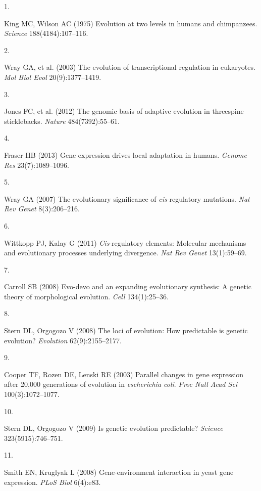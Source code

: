 \documentclass[9pt,twocolumn,twoside,lineno]{pnas-new}
\newlength{\cslhangindent}
\newlength{\csllabelwidth}
\newlength{\cslentryspacingunit} %
\newenvironment{CSLReferences}[2] %
 {%
  \setlength{\parindent}{0pt}
  \ifodd #1
  \let\oldpar\par
  \def\par{\hangindent=\cslhangindent\oldpar}
  \fi
  \setlength{\parskip}{#2\cslentryspacingunit}
 }%
 {}
\newcommand{\CSLLeftMargin}[1]{\parbox[t]{\csllabelwidth}{#1}}
\newcommand{\CSLRightInline}[1]{\parbox[t]{\linewidth - \csllabelwidth}{#1}\break}
\begin{document}
\hypertarget{refs}{}
\begin{CSLReferences}{0}{0}
\leavevmode\hypertarget{ref-King1975}{}%
\CSLLeftMargin{1. }
\CSLRightInline{King MC, Wilson AC (1975) Evolution at two levels in
humans and chimpanzees. \emph{Science} 188(4184):107--116.}

\leavevmode\hypertarget{ref-Wray2003}{}%
\CSLLeftMargin{2. }
\CSLRightInline{Wray GA, et al. (2003) The evolution of transcriptional
regulation in eukaryotes. \emph{Mol Biol Evol} 20(9):1377--1419.}

\leavevmode\hypertarget{ref-Jones2012}{}%
\CSLLeftMargin{3. }
\CSLRightInline{Jones FC, et al. (2012) The genomic basis of adaptive
evolution in threespine sticklebacks. \emph{Nature} 484(7392):55--61.}

\leavevmode\hypertarget{ref-Fraser2013}{}%
\CSLLeftMargin{4. }
\CSLRightInline{Fraser HB (2013) Gene expression drives local adaptation
in humans. \emph{Genome Res} 23(7):1089--1096.}

\leavevmode\hypertarget{ref-Wray2007}{}%
\CSLLeftMargin{5. }
\CSLRightInline{Wray GA (2007) The evolutionary significance of
\emph{cis}-regulatory mutations. \emph{Nat Rev Genet} 8(3):206--216.}

\leavevmode\hypertarget{ref-Wittkopp2011}{}%
\CSLLeftMargin{6. }
\CSLRightInline{Wittkopp PJ, Kalay G (2011) \emph{Cis}-regulatory
elements: Molecular mechanisms and evolutionary processes underlying
divergence. \emph{Nat Rev Genet} 13(1):59--69.}

\leavevmode\hypertarget{ref-Carroll2008}{}%
\CSLLeftMargin{7. }
\CSLRightInline{Carroll SB (2008) Evo-devo and an expanding evolutionary
synthesis: A genetic theory of morphological evolution. \emph{Cell}
134(1):25--36.}

\leavevmode\hypertarget{ref-Stern2008}{}%
\CSLLeftMargin{8. }
\CSLRightInline{Stern DL, Orgogozo V (2008) The loci of evolution: How
predictable is genetic evolution? \emph{Evolution} 62(9):2155--2177.}

\leavevmode\hypertarget{ref-Cooper2003}{}%
\CSLLeftMargin{9. }
\CSLRightInline{Cooper TF, Rozen DE, Lenski RE (2003) Parallel changes
in gene expression after 20,000 generations of evolution in
\emph{escherichia coli}. \emph{Proc Natl Acad Sci} 100(3):1072--1077.}

\leavevmode\hypertarget{ref-Stern2009}{}%
\CSLLeftMargin{10. }
\CSLRightInline{Stern DL, Orgogozo V (2009) Is genetic evolution
predictable? \emph{Science} 323(5915):746--751.}

\leavevmode\hypertarget{ref-Smith2008}{}%
\CSLLeftMargin{11. }
\CSLRightInline{Smith EN, Kruglyak L (2008) Gene-environment interaction
in yeast gene expression. \emph{PLoS Biol} 6(4):e83.}


\end{CSLReferences}
\end{document}

